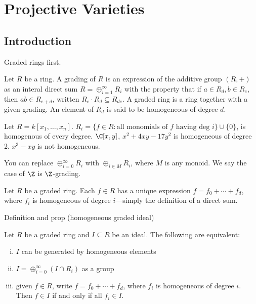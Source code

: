 \newpage
\section{Projective Varieties}
\subsection{Introduction}

Graded rings first.

\begin{dfn}[Grading]
Let $R$ be a ring. A grading of $R$ is an expression of the additive group $(R,+)$ as an interal direct sum $R= \oplus_{i=1}^\infty R_i$ with the property that if $a \in R_d, b \in R_e$, then $ab \in R_{e+d}$, written $R_e \cdot R_d \subseteq R_{de}$. A graded ring is a ring together with a given grading. An element of $R_d$ is said to be homogeneous of degree $d$. 
\end{dfn}


\begin{ex}
Let $R= k[x_1,\ldots,x_n]$. $R_i= \{ f \in R \colon \text{all monomials of }f\text{ having deg }i\} \cup \{0\}$, is homogenous of every degree. $\C[x,y]$, $x^2+4xy-17y^2$ is homogeneous of degree 2. $x^3-xy$ is not homogeneous. \xqed
\end{ex}


\begin{rem}
You can replace $\oplus_{i=0}^\infty R_i$ with $\oplus_{i \in M} R_i$, where $M$ is any monoid. We say the case of $\Z$ is $\Z$-grading. 
\end{rem}


Let $R$ be a graded ring. Each $f \in R$ has a unique expression $f= f_0 + \cdots + f_d$, where $f_i$ is homogeneous of degree $i$---simply the definition of a direct sum. 


















Definition and prop (homogeneous graded ideal)


\begin{prop}
Let $R$ be a graded ring and $I \subseteq R$ be an ideal. The following are equivalent:
\begin{enumerate}[(i)]
\item $I$ can be generated by homogeneous elements
\item $I= \oplus_{i=0}^\infty (I \cap R_i)$ as a group
\item given $f \in R$, write $f= f_0 + \cdots + f_d$, where $f_i$ is homogeneous of degree $i$. Then $f \in I$ if and only if all $f_i \in I$. 
\end{enumerate}
\end{prop}

